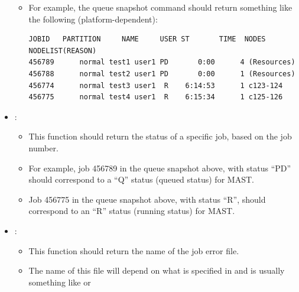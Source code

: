 \documentclass[letterpaper,10pt,english]{sphinxmanual}
\begin{document}
\begin{itemize}
\begin{itemize}
\item {} 
For example, the queue snapshot command should return something like the following (platform-dependent):

\begin{Verbatim}[commandchars=\\\{\}]
JOBID   PARTITION     NAME     USER ST       TIME  NODES NODELIST(REASON)
456789      normal test1 user1 PD       0:00      4 (Resources)
456788      normal test2 user1 PD       0:00      1 (Resources)
456774      normal test3 user1  R    6:14:53      1 c123-124
456775      normal test4 user1  R    6:15:34      1 c125-126
\end{Verbatim}

\end{itemize}

\item {} 
:
\begin{itemize}
\item {} 
This function should return the status of a specific job, based on the job number.

\item {} 
For example, job 456789 in the queue snapshot above, with status ``PD'' should correspond to a ``Q'' status (queued status) for MAST.

\item {} 
Job 456775 in the queue snapshot above, with status ``R'', should correspond to an ``R'' status (running status) for MAST.

\end{itemize}

\item {} 
:
\begin{itemize}
\item {} 
This function should return the name of the job error file.

\item {} 
The name of this file will depend on what is specified in  and is usually something like  or 

\end{itemize}

\end{itemize}
\end{document}
